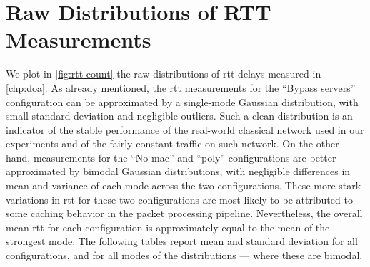 \chapter{Raw Distributions of RTT Measurements}
\label{app:rtt}

We plot in \cref{fig:rtt-count} the raw distributions of \acrshort{rtt} delays measured in
\cref{chp:doa}. As already mentioned, the \acrshort{rtt} measurements for the ``Bypass servers''
configuration can be approximated by a single-mode Gaussian distribution, with small standard
deviation and negligible outliers. Such a clean distribution is an indicator of the stable
performance of the real-world classical network used in our experiments and of the fairly constant
traffic on such network. On the other hand, measurements for the ``No \acrshort{mac}'' and
``\acrshort{poly}'' configurations are better approximated by bimodal Gaussian distributions, with
negligible differences in mean and variance of each mode across the two configurations. These more
stark variations in \acrshort{rtt} for these two configurations are most likely to be attributed to
some caching behavior in the packet processing pipeline. Nevertheless, the overall mean
\acrshort{rtt} for each configuration is approximately equal to the mean of the strongest mode. The
following tables report mean and standard deviation for all configurations, and for all modes of the
distributions --- where these are bimodal.

